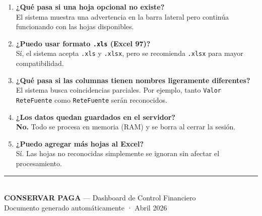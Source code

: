 \documentclass[11pt,a4paper]{article}
\begin{document}
\begin{enumerate}
    \item \textbf{¿Qué pasa si una hoja opcional no existe?}\\
    El sistema muestra una advertencia en la barra lateral pero continúa funcionando con las hojas disponibles.
    
    \item \textbf{¿Puedo usar formato \texttt{.xls} (Excel 97)?}\\
    Sí, el sistema acepta \texttt{.xls} y \texttt{.xlsx}, pero se recomienda \texttt{.xlsx} para mayor compatibilidad.
    
    \item \textbf{¿Qué pasa si las columnas tienen nombres ligeramente diferentes?}\\
    El sistema busca coincidencias parciales. Por ejemplo, tanto \texttt{Valor ReteFuente} como \texttt{ReteFuente} serán reconocidos.
    
    \item \textbf{¿Los datos quedan guardados en el servidor?}\\
    \textbf{No.} Todo se procesa en memoria (RAM) y se borra al cerrar la sesión.
    
    \item \textbf{¿Puedo agregar más hojas al Excel?}\\
    Sí. Las hojas no reconocidas simplemente se ignoran sin afectar el procesamiento.
\end{enumerate}

\vfill
\begin{center}
\textcolor{gris}{\rule{0.5\textwidth}{0.5pt}}\\[0.3cm]
\textcolor{verde}{\textbf{CONSERVAR PAGA}} — Dashboard de Control Financiero\\
\textcolor{gris}{\small Documento generado automáticamente · Abril 2026}
\end{center}
\end{document}
